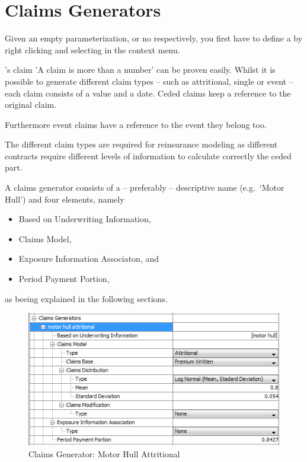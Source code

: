 \section{Claims Generators}

Given an empty parameterization, or no  respectively, you first have to define a  by right clicking and selecting  in the context menu. 

\RiskAnalytics 's claim 'A claim is more than a number' can be proven easily. Whilst it is possible to generate different claim types -- such as attritional, single or event -- each claim consists of a value and a date. Ceded claims keep a reference to the original claim. 

Furthermore event claims have a reference to the event they belong too.

The different claim types are required for reinsurance modeling as different contracts require different levels of information to calculate correctly the ceded part.

A claims generator consists of a -- preferably -- descriptive name (e.g.~`Motor Hull') and four elements, namely

\begin{itemize}
	\item Based on Underwriting Information,
	\item Claims Model,
	\item Exposure Information Associaton, and
	\item Period Payment Portion, 
\end{itemize}
 
as beeing explained in the following sections.

\begin{figure}[htb]
	\centering
		\includegraphics[scale=0.6]{images/ClaimsGenerator.png}
	\caption{Claims Generator: Motor Hull Attritional}
	\label{fig:ClaimsGenerator}
\end{figure}

